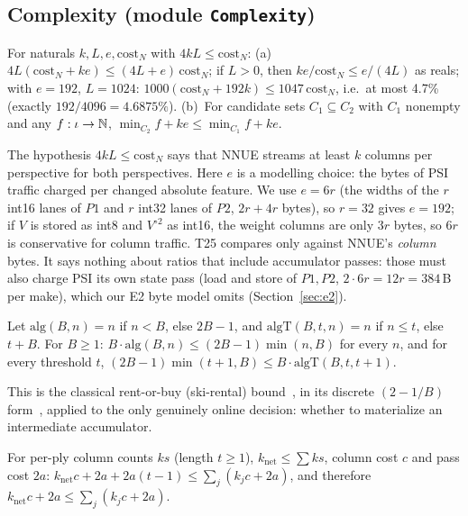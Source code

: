\subsection{Complexity (module \texttt{Complexity})}

\begin{theorem}\label{thm:t25}
For naturals $k,L,e,\mathrm{cost}_N$ with $4kL\le\mathrm{cost}_N$:
(a)~$4L(\mathrm{cost}_N+ke)\le(4L+e)\,\mathrm{cost}_N$; if $L>0$, then $ke/\mathrm{cost}_N\le e/(4L)$ as reals;
with $e=192$, $L=1024$: $1000(\mathrm{cost}_N+192k)\le1047\,\mathrm{cost}_N$, i.e.\ at most 4.7\% (exactly $192/4096=4.6875\%$).
(b)~For candidate sets $C_1\subseteq C_2$ with $C_1$ nonempty and any $f:\iota\to\mathbb{N}$, $\min_{C_2}f+ke\le\min_{C_1}f+ke$.
\end{theorem}
\noindent The hypothesis $4kL\le\mathrm{cost}_N$ says that NNUE streams at least $k$ columns per perspective for both perspectives.
Here $e$ is a modelling choice: the bytes of PSI traffic charged per changed absolute feature.
We use $e=6r$ (the widths of the $r$ int16 lanes of $P1$ and $r$ int32 lanes of $P2$, $2r+4r$ bytes), so $r=32$ gives $e=192$; if $V$ is stored as int8 and $V^{\circ2}$ as int16, the weight columns are only $3r$ bytes, so $6r$ is conservative for column traffic.
T25 compares only against NNUE's \emph{column} bytes.
It says nothing about ratios that include accumulator passes: those must also charge PSI its own state pass (load and store of $P1,P2$, $2\cdot6r=12r=384$\,B per make), which our E2 byte model omits (Section~\ref{sec:e2}).

\begin{theorem}\label{thm:a1}
Let $\mathrm{alg}(B,n)=n$ if $n<B$, else $2B-1$, and $\mathrm{algT}(B,t,n)=n$ if $n\le t$, else $t+B$. For $B\ge1$: $B\cdot\mathrm{alg}(B,n)\le(2B-1)\min(n,B)$ for every $n$, and for every threshold $t$, $(2B-1)\min(t+1,B)\le B\cdot\mathrm{algT}(B,t,t+1)$.
\end{theorem}
\noindent This is the classical rent-or-buy (ski-rental) bound~\cite{karlin1988}, in its discrete $(2-1/B)$ form~\cite{borodin1998}, applied to the only genuinely online decision: whether to materialize an intermediate accumulator.

\begin{theorem}\label{thm:a2}
For per-ply column counts $ks$ (length $t\ge1$), $k_{\text{net}}\le\sum ks$, column cost $c$ and pass cost $2a$:
$k_{\text{net}}c+2a+2a(t-1)\le\sum_j(k_jc+2a)$, and therefore $k_{\text{net}}c+2a\le\sum_j(k_jc+2a)$.
\end{theorem}

